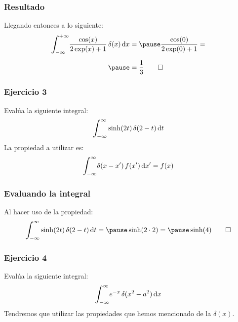\documentclass[12pt]{beamer}
\begin{document}
\begin{frame}
\frametitle{Resultado}
Llegando entonces a lo siguiente:
\pause
\begin{eqnarray*}
\begin{aligned}
\scaleint{6ex}_{\bs -\infty}^{+\infty} \dfrac{\cos (x)}{2 \exp(x) + 1} \, \delta (x) \dd{x} &= \pause \dfrac{\cos (0)}{2 \exp (0) + 1} = \\[0.5em] \pause
&= \dfrac{1}{3} \qed
\end{aligned}
\end{eqnarray*}
\end{frame}

\begin{frame}
\frametitle{Ejercicio 3}
Evalúa la siguiente integral:
\pause
\begin{align*}
\scaleint{6ex}_{\bs -\infty}^{\infty} \sinh (2 t) \, \delta (2 - t) \dd{t}
\end{align*}
\pause
La propiedad a utilizar es:
\pause
\begin{align*}
\scaleint{6ex}_{\bs -\infty}^{\infty} \delta (x - \pderivada{x}) \, f (\pderivada{x}) \dd{\pderivada{x}} = f (x)
\end{align*}
\end{frame}

\begin{frame}
\frametitle{Evaluando la integral}
Al hacer uso de la propiedad:
\pause
\begin{eqnarray*}
\begin{aligned}
\scaleint{6ex}_{\bs -\infty}^{\infty} \sinh (2 t) \, \delta (2 - t) \dd{t} = \pause \sinh (2 \cdot 2) = \pause \sinh (4) \qed
\end{aligned}
\end{eqnarray*}
\end{frame}

\begin{frame}
\frametitle{Ejercicio 4}
Evalúa la siguiente integral:
\pause
\begin{align*}
\scaleint{6ex}_{\bs -\infty}^{\infty} e^{-x} \, \delta(x^{2} - a^{2}) \dd{x}
\end{align*}
\pause
Tendremos que utilizar las propiedades que hemos mencionado de la $\delta (x)$.
\end{frame}
\end{document}
